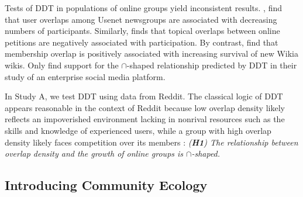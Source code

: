 \documentclass[letterpaper]{article}\usepackage[]{graphicx}\usepackage[]{color}
\begin{document}



Tests of DDT in populations of online groups yield inconsistent results. \citet{wang_impact_2012}, find that user overlaps among Usenet newsgroups are associated with decreasing numbers of participants. Similarly, \citet{teblunthuis_density_2017} finds that topical overlaps between online petitions are negatively associated with participation. 
By contrast, \citet{zhu_impact_2014} find that membership overlap is positively associated with increasing survival of new Wikia wikis. Only \citet{zhu_selecting_2014} find support for the $\cap$-shaped relationship predicted by DDT in their study of an enterprise social media platform.

In Study A, we test DDT using data from Reddit. The classical logic of DDT appears reasonable in the context of Reddit because low overlap density likely reflects an impoverished environment lacking in nonrival resources such as the skills and knowledge of experienced users, while a group with high overlap density likely faces competition over its members \cite{zhu_selecting_2014, zhu_impact_2014}:
\textit{(\textbf{H1}) The relationship between overlap density and the growth of online groups is  $\cap$-shaped.}


\subsection{Introducing Community Ecology \label{sec:community_ecology}}
\end{document}
